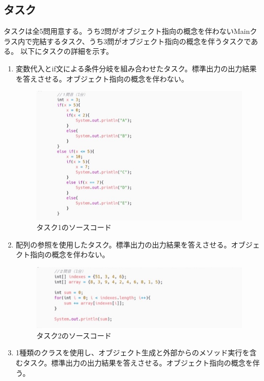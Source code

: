 \documentclass[paper=a4paper,fontsize=11pt]{jlreq}
\begin{document}
  \subsection{タスク}
    タスクは全5問用意する。うち2問がオブジェクト指向の概念を伴わないMainクラス内で完結するタスク、うち3問がオブジェクト指向の概念を伴うタスクである。
    以下にタスクの詳細を示す。\\
    \begin{enumerate}[label=タスク\arabic*:]
      \item 変数代入とif文による条件分岐を組み合わせたタスク。標準出力の出力結果を答えさせる。オブジェクト指向の概念を伴わない。
      \begin{figure}[h]
        \centering
        \includegraphics[height=0.5\linewidth]{プログラム画像_タスク1.jpg}
        \caption{タスク1のソースコード}
      \end{figure}
      \FloatBarrier
      \item 配列の参照を使用したタスク。標準出力の出力結果を答えさせる。オブジェクト指向の概念を伴わない。
      \begin{figure}[h]
        \centering
        \includegraphics[height=0.25\linewidth]{プログラム画像_タスク2.jpg}
        \caption{タスク2のソースコード}
      \end{figure}
      \FloatBarrier
      \item 1種類のクラスを使用し、オブジェクト生成と外部からのメソッド実行を含むタスク。標準出力の出力結果を答えさせる。オブジェクト指向の概念を伴う。
      \begin{figure}[h]

\end{figure}
\end{enumerate}
\end{document}
